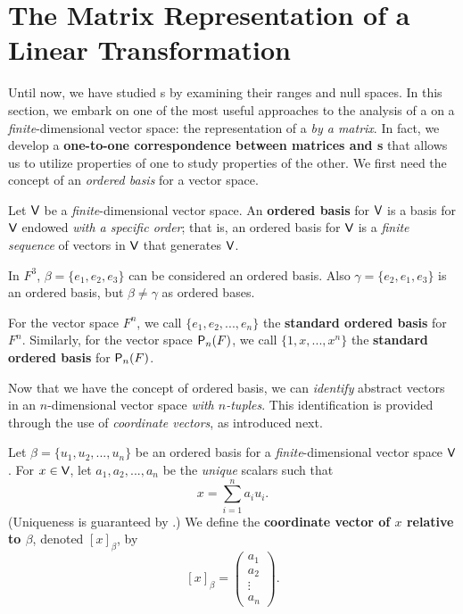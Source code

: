 \section{The Matrix Representation of a Linear Transformation} \label{sec 2.2}

Until now, we have studied \LTRAN{}s by examining their ranges and null spaces.
In this section, we embark on one of the most useful approaches to the analysis of a \LTRAN{} on a \emph{finite}-dimensional vector space:
the representation of a \LTRAN{} \emph{by a matrix}.
In fact, we develop a \textbf{one-to-one correspondence between matrices and \LTRAN{}s} that allows us to utilize properties of one to study properties of the other.
We first need the concept of an \emph{ordered basis} for a vector space.

\begin{definition} \label{def 2.4}
Let \(\textsf{V}\) be a \emph{finite}-dimensional vector space.
An \textbf{ordered basis} for \(\textsf{V}\) is a basis for \(\textsf{V}\) endowed \emph{with a specific order};
that is, an ordered basis for \(\textsf{V}\) is a \emph{finite sequence} of \LID{} vectors in \(\textsf{V}\) that generates \(\textsf{V}\).
\end{definition}

\begin{example} \label{example 2.2.1}
In \(F^3\), \(\beta = \{ e_1, e_2, e_3 \}\) can be considered an ordered basis.
Also \(\gamma = \{ e_2, e_1, e_3 \}\) is an ordered basis, but \(\beta \ne \gamma\) as ordered bases.
\end{example}

\begin{additional definition} \label{adef 2.4}
For the vector space \(F^n\), we call \(\{ e_1, e_2, ..., e_n \}\) the \textbf{standard ordered basis} for \(F^n\).
Similarly, for the vector space \(\textsf{P}_n(F)\), we call \(\{ 1, x, ..., x^n \}\) the \textbf{standard ordered basis} for \(\textsf{P}_n(F)\).
\end{additional definition}

\begin{remark} \label{remark 2.2.1}
Now that we have the concept of ordered basis, we can \emph{identify} abstract vectors in an \(n\)-dimensional vector space \emph{with \(n\)-tuples}.
This identification is provided through the use of \emph{coordinate vectors}, as introduced next.
\end{remark}

\begin{definition} \label{def 2.5}
Let \(\beta = \{ u_1, u_2, ..., u_n \}\) be an ordered basis for a \emph{finite}-dimensional vector space \(\textsf{V}\).
For \(x \in \textsf{V}\), let \(a_1, a_2, ..., a_n\) be the \emph{unique} scalars such that
\[
    x = \sum_{i = 1}^n a_i u_i.
\]
(Uniqueness is guaranteed by .)
We define the \textbf{coordinate vector of \(x\) relative to \(\beta\)}, denoted \([x]_{\beta}\), by
\[
    [x]_{\beta} = \begin{pmatrix} a_1 \\ a_2 \\ \vdots \\ a_n \end{pmatrix}.
\]
\end{definition}

